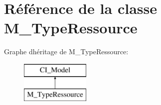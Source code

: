 \hypertarget{class_m___type_ressource}{}\section{Référence de la classe M\+\_\+\+Type\+Ressource}
\label{class_m___type_ressource}
Graphe d\textquotesingle{}héritage de M\+\_\+\+Type\+Ressource\+:\begin{figure}[H]
\begin{center}
\leavevmode
\includegraphics[height=2.000000cm]{class_m___type_ressource}
\end{center}
\end{figure}
